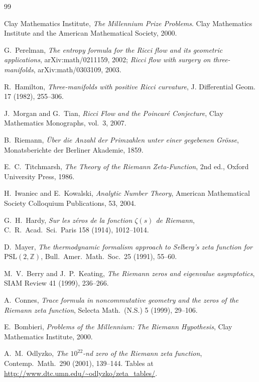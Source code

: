 \documentclass[11pt,a4paper]{amsart}
\theoremstyle{plain}
\theoremstyle{definition}
\newcommand{\Zn}{\mathbb{Z}}
\begin{document}
\begin{thebibliography}{99}

 Clay Mathematics Institute, \emph{The Millennium Prize
Problems}. Clay Mathematics Institute and the American Mathematical
Society, 2000.

 G.~Perelman, \emph{The entropy formula for the
Ricci flow and its geometric applications}, arXiv:math/0211159, 2002;
\emph{Ricci flow with surgery on three-manifolds}, arXiv:math/0303109,
2003.

 R.~Hamilton, \emph{Three-manifolds with positive
Ricci curvature}, J. Differential Geom. 17 (1982), 255--306.

 J.~Morgan and G.~Tian, \emph{Ricci Flow and the
Poincar\'e Conjecture}, Clay Mathematics Monographs, vol.~3, 2007.

 B.~Riemann, \emph{\"Uber die Anzahl der Primzahlen
unter einer gegebenen Gr\"osse}, Monatsberichte der Berliner Akademie,
1859.

 E.~C.~Titchmarsh, \emph{The Theory of the
Riemann Zeta-Function}, 2nd ed., Oxford University Press, 1986.

 H.~Iwaniec and E.~Kowalski, \emph{Analytic Number
Theory}, American Mathematical Society Colloquium Publications, 53, 2004.

 G.~H.~Hardy, \emph{Sur les z\'eros de la fonction
$\zeta(s)$ de Riemann}, C.~R.~Acad.~Sci.~Paris 158 (1914), 1012--1014.

 D.~Mayer, \emph{The thermodynamic formalism approach
to Selberg's zeta function for $\mathrm{PSL}(2,\Zn)$},
Bull.~Amer.~Math.~Soc.~25 (1991), 55--60.

 M.~V.~Berry and J.~P.~Keating, \emph{The Riemann zeros
and eigenvalue asymptotics}, SIAM Review 41 (1999), 236--266.

 A.~Connes, \emph{Trace formula in noncommutative
geometry and the zeros of the Riemann zeta function},
Selecta Math.~(N.S.) 5 (1999), 29--106.

 E.~Bombieri, \emph{Problems of the Millennium:
The Riemann Hypothesis}, Clay Mathematics Institute, 2000.

 A.~M.~Odlyzko, \emph{The $10^{22}$-nd zero of the
Riemann zeta function}, Contemp.~Math.~290 (2001), 139--144. Tables at
\url{http://www.dtc.umn.edu/~odlyzko/zeta_tables/}.


\end{thebibliography}
\end{document}
